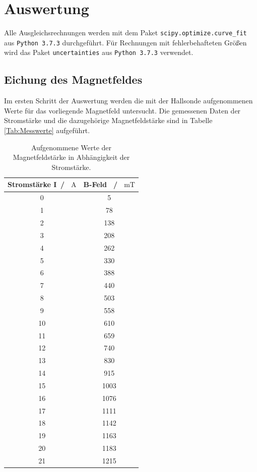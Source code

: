 \section{Auswertung}
Alle Ausgleichsrechnungen werden mit dem Paket \texttt{scipy.optimize.curve\_fit}  aus \texttt{Python 3.7.3} durchgeführt.
Für Rechnungen mit fehlerbehafteten Größen wird das Paket \texttt{uncertainties} aus \texttt{Python 3.7.3} verwendet.

\subsection{Eichung des Magnetfeldes}
Im ersten Schritt der Auswertung werden die mit der Hallsonde aufgenommenen Werte für das
vorliegende Magnetfeld untersucht. Die gemessenen Daten der Stromstärke und die dazugehörige
Magnetfeldstärke sind in Tabelle \ref{Tab:Messwerte} aufgeführt.
\begin{table}[H]
    \centering
    \caption{Aufgenommene Werte der Magnetfeldstärke in Abhängigkeit der Stromstärke.}
    \label{tab:Messwerte}
    \begin{tabular}{cc}
      \toprule
      Stromstärke I\, / \, $\si{\ampere}$ & B-Feld \, / \, $\si{\milli\tesla}$  \\
      \midrule
      0 &    5 \\
      1 &   78 \\
      2 &  138 \\
      3 &  208 \\
      4 &  262 \\
      5 &  330 \\
      6 &  388 \\
      7 &  440 \\
      8 &  503 \\
      9 &  558 \\
     10 &  610 \\
     11 &  659 \\
     12 &  740 \\
     13 &  830 \\
     14 &  915 \\
     15 & 1003 \\
     16 & 1076 \\
     17 & 1111 \\
     18 & 1142 \\
     19 & 1163 \\
     20 & 1183 \\
     21 & 1215 \\
      \bottomrule
  \end{tabular}
 \end{table} \noindent
